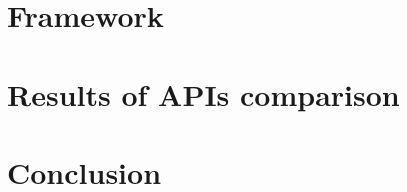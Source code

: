\documentclass[11pt,english,openright]{book}
\begin{document}
\chapter{Framework\label{ch:framework}}


\chapter{Results of APIs comparison\label{ch:results}}


\chapter{Conclusion\label{ch:conclusion}}






\listoffigures
{}

\listoftables
{}
\end{document}
